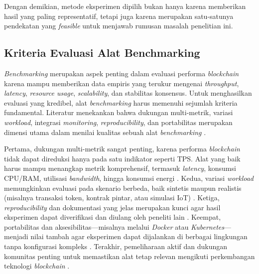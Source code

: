 Dengan demikian, metode eksperimen dipilih bukan hanya karena memberikan hasil yang paling representatif, tetapi juga karena merupakan satu-satunya pendekatan yang \textit{feasible} untuk menjawab rumusan masalah penelitian ini.


\subsection{Kriteria Evaluasi Alat Benchmarking}

\textit{Benchmarking} merupakan aspek penting dalam evaluasi performa \textit{blockchain} karena mampu memberikan data empiris yang terukur mengenai \textit{throughput}, \textit{latency}, \textit{resource usage}, \textit{scalability}, dan stabilitas konsensus. Untuk menghasilkan evaluasi yang kredibel, alat \textit{benchmarking} harus memenuhi sejumlah kriteria fundamental. Literatur menekankan bahwa dukungan multi-metrik, variasi \textit{workload}, integrasi \textit{monitoring}, \textit{reproducibility}, dan portabilitas merupakan dimensi utama dalam menilai kualitas sebuah alat \textit{benchmarking} \cite{fan2020, beyer2017, martinez2022}.

Pertama, dukungan multi-metrik sangat penting, karena performa \textit{blockchain} tidak dapat direduksi hanya pada satu indikator seperti TPS. Alat yang baik harus mampu menangkap metrik komprehensif, termasuk \textit{latency}, konsumsi CPU/RAM, utilisasi \textit{bandwidth}, hingga konsumsi energi \cite{fan2020, zheng2019}. Kedua, variasi \textit{workload} memungkinkan evaluasi pada skenario berbeda, baik sintetis maupun realistis (misalnya transaksi token, kontrak pintar, atau simulasi IoT) \cite{dinh2017, beyer2017}. Ketiga, \textit{reproducibility} dan dokumentasi yang jelas merupakan kunci agar hasil eksperimen dapat diverifikasi dan diulang oleh peneliti lain \cite{beyer2017, beyer2024}. Keempat, portabilitas dan aksesibilitas—misalnya melalui \textit{Docker} atau \textit{Kubernetes}—menjadi nilai tambah agar eksperimen dapat dijalankan di berbagai lingkungan tanpa konfigurasi kompleks \cite{martinez2022, quetschlich2022}. Terakhir, pemeliharaan aktif dan dukungan komunitas penting untuk memastikan alat tetap relevan mengikuti perkembangan teknologi \textit{blockchain} \cite{zheng2019}.

